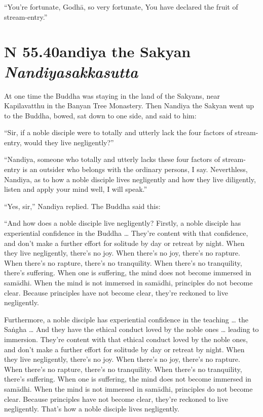 \documentclass[12pt,openany]{book}%
\newcommand*{\suttatitleacronym}[1]{\smaller[2]{#1}\vspace*{.3em}}
\newcommand*{\suttatitletranslation}[1]{\linebreak{#1}}
\newcommand*{\suttatitleroot}[1]{\linebreak\smaller[2]\itshape{#1}}
\newcommand*{\tocacronym}[1]{\hspace*{-3.3em}{#1}\quad}
\newcommand*{\toctranslation}[1]{#1}
\newcommand*{\tocroot}[1]{(\textit{#1})}
\begin{document}
“You’re fortunate, \textsanskrit{Godhā}, so very fortunate, You have declared the fruit of stream-entry.” 

%
\section*{{\suttatitleacronym SN 55.40}{\suttatitletranslation Nandiya the Sakyan }{\suttatitleroot Nandiyasakkasutta}}
\addcontentsline{toc}{section}{\tocacronym{SN 55.40} \toctranslation{Nandiya the Sakyan } \tocroot{Nandiyasakkasutta}}

At one time the Buddha was staying in the land of the Sakyans, near Kapilavatthu in the Banyan Tree Monastery. Then Nandiya the Sakyan went up to the Buddha, bowed, sat down to one side, and said to him: 

“Sir, if a noble disciple were to totally and utterly lack the four factors of stream-entry, would they live negligently?” 

“Nandiya, someone who totally and utterly lacks these four factors of stream-entry is an outsider who belongs with the ordinary persons, I say. Neverthless, Nandiya, as to how a noble disciple lives negligently and how they live diligently, listen and apply your mind well, I will speak.” 

“Yes, sir,” Nandiya replied. The Buddha said this: 

“And how does a noble disciple live negligently? Firstly, a noble disciple has experiential confidence in the Buddha … They’re content with that confidence, and don’t make a further effort for solitude by day or retreat by night. When they live negligently, there’s no joy. When there’s no joy, there’s no rapture. When there’s no rapture, there’s no tranquility. When there’s no tranquility, there’s suffering. When one is suffering, the mind does not become immersed in \textsanskrit{samādhi}. When the mind is not immersed in \textsanskrit{samādhi}, principles do not become clear. Because principles have not become clear, they’re reckoned to live negligently. 

Furthermore, a noble disciple has experiential confidence in the teaching … the \textsanskrit{Saṅgha} … And they have the ethical conduct loved by the noble ones … leading to immersion. They’re content with that ethical conduct loved by the noble ones, and don’t make a further effort for solitude by day or retreat by night. When they live negligently, there’s no joy. When there’s no joy, there’s no rapture. When there’s no rapture, there’s no tranquility. When there’s no tranquility, there’s suffering. When one is suffering, the mind does not become immersed in \textsanskrit{samādhi}. When the mind is not immersed in \textsanskrit{samādhi}, principles do not become clear. Because principles have not become clear, they’re reckoned to live negligently. That’s how a noble disciple lives negligently. 
\end{document}
